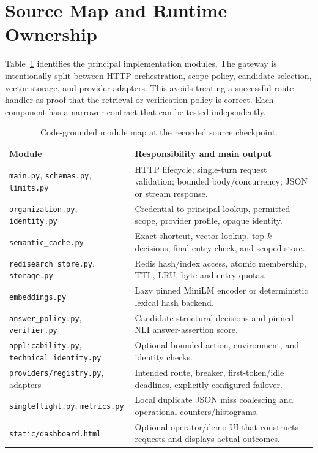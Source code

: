 \section{Source Map and Runtime Ownership}
Table~\ref{tab:source_map} identifies the principal implementation modules. The gateway is intentionally split between HTTP orchestration, scope policy, candidate selection, vector storage, and provider adapters. This avoids treating a successful route handler as proof that the retrieval or verification policy is correct. Each component has a narrower contract that can be tested independently.

\begin{table}[htbp]\centering\small
\caption{Code-grounded module map at the recorded source checkpoint.}\label{tab:source_map}
\begin{tabular}{p{4.7cm}p{7.8cm}}\toprule
Module & Responsibility and main output \\\midrule
\texttt{main.py}, \texttt{schemas.py}, \texttt{limits.py} & HTTP lifecycle; single-turn request validation; bounded body/concurrency; JSON or stream response. \\
\texttt{organization.py}, \texttt{identity.py} & Credential-to-principal lookup, permitted scope, provider profile, opaque identity. \\
\texttt{semantic\_cache.py} & Exact shortcut, vector lookup, top-$k$ decisions, final entry check, and scoped store. \\
\texttt{redisearch\_store.py}, \texttt{storage.py} & Redis hash/index access, atomic membership, TTL, LRU, byte and entry quotas. \\
\texttt{embeddings.py} & Lazy pinned MiniLM encoder or deterministic lexical hash backend. \\
\texttt{answer\_policy.py}, \texttt{verifier.py} & Candidate structural decisions and pinned NLI answer-assertion score. \\
\texttt{applicability.py}, \texttt{technical\_identity.py} & Optional bounded action, environment, and identity checks. \\
\texttt{providers/registry.py}, adapters & Intended route, breaker, first-token/idle deadlines, explicitly configured failover. \\
\texttt{singleflight.py}, \texttt{metrics.py} & Local duplicate JSON miss coalescing and operational counters/histograms. \\
\texttt{static/dashboard.html} & Optional operator/demo UI that constructs requests and displays actual outcomes. \\\bottomrule
\end{tabular}
\end{table}

